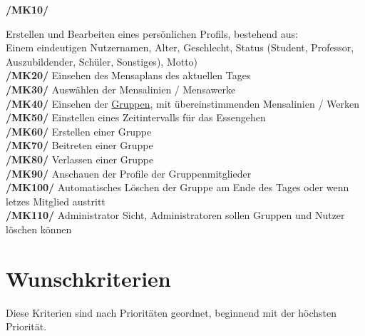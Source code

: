 \documentclass[a4paper]{scrreprt}
\begin{document}
\begin{addmargin}[25pt]{0pt} 
\hypertarget{mk10}{\textbf{/MK10/}} Erstellen und Bearbeiten eines persönlichen Profils, bestehend aus: \\ Einem eindeutigen Nutzernamen, Alter, Geschlecht, Status (Student, Professor, Auszubildender, Schüler, Sonstiges), Motto)\\
\hypertarget{mk20}{\textbf{/MK20/}} Einsehen des Mensaplans des aktuellen Tages\\
\hypertarget{mk30}{\textbf{/MK30/}} Auswählen der Mensalinien / Mensawerke\\
\hypertarget{mk40}{\textbf{/MK40/}} Einsehen der \hyperlink{gruppe}{Gruppen}, mit übereinstimmenden Mensalinien / Werken\\
\hypertarget{mk50}{\textbf{/MK50/}} Einstellen eines Zeitintervalls für das Essengehen \\
\hypertarget{mk60}{\textbf{/MK60/}} Erstellen einer Gruppe\\
\hypertarget{mk70}{\textbf{/MK70/}} Beitreten einer Gruppe\\
\hypertarget{mk80}{\textbf{/MK80/}} Verlassen einer Gruppe\\
\hypertarget{mk90}{\textbf{/MK90/}} Anschauen der Profile der Gruppenmitglieder\\
\hypertarget{mk100}{\textbf{/MK100/}} Automatisches Löschen der Gruppe am Ende des Tages oder wenn letzes Mitglied austritt\\
\hypertarget{mk110}{\textbf{/MK110/}} Administrator Sicht, Administratoren sollen Gruppen und Nutzer löschen können\\
\end{addmargin}

\section{Wunschkriterien}
Diese Kriterien sind nach Prioritäten geordnet, beginnend mit der höchsten Priorität.
\end{document}
